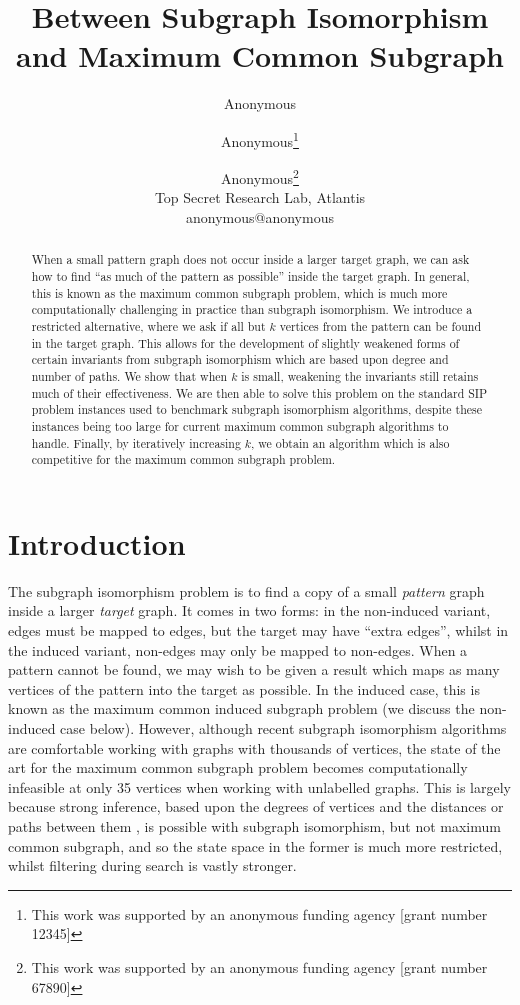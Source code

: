 \documentclass[letterpaper]{article}
\title{Between Subgraph Isomorphism and Maximum Common Subgraph}
\author{Anonymous \and Anonymous\thanks{This work was supported by an anonymous funding agency [grant number 12345]} \and Anonymous\thanks{This work was supported by an anonymous funding agency [grant number 67890]} \\
Top Secret Research Lab, Atlantis \\
anonymous@anonymous}
\newcommand{\citep}[1]{\cite{#1}}
\theoremstyle{definition}
\begin{document}
\maketitle

\begin{abstract}
    When a small pattern graph does not occur inside a larger target graph, we can ask how to find
    ``as much of the pattern as possible'' inside the target graph. In general, this is known as the maximum
    common subgraph problem, which is much more computationally challenging in practice than
    subgraph isomorphism. We introduce a restricted alternative, where we ask if all but $k$
    vertices from the pattern can be found in the target graph. This allows for the development of
    slightly weakened forms of certain invariants from subgraph isomorphism which are based upon degree and
    number of paths.  We show that when $k$ is small, weakening the invariants still retains much of
    their effectiveness. We are then able to solve this problem on the standard SIP problem
    instances used to benchmark subgraph isomorphism algorithms, despite these instances being
    too large for current maximum common subgraph algorithms to handle. Finally, by iteratively
    increasing $k$, we obtain an algorithm which is also competitive for the maximum common subgraph
    problem.
\end{abstract}

\section{Introduction}

The subgraph isomorphism problem is to find a copy of a small \emph{pattern} graph inside a larger
\emph{target} graph. It comes in two forms: in the non-induced variant, edges must be mapped to
edges, but the target may have ``extra edges'', whilst in the induced variant, non-edges may only be
mapped to non-edges. When a pattern cannot be found, we may wish to be given a result which maps as
many vertices of the pattern into the target as possible. In the induced case, this is known as the
maximum common induced subgraph problem (we discuss the non-induced case below). However, although
recent subgraph isomorphism algorithms are comfortable working with graphs with thousands of
vertices, the state of the art for the maximum common subgraph problem
\citep{DBLP:conf/cp/McCreeshNPS16} becomes computationally infeasible at only 35 vertices when
working with unlabelled graphs. This is largely because strong inference, based upon the degrees of
vertices \citep{DBLP:journals/ai/Solnon10} and the distances or paths between them
\citep{DBLP:conf/cp/AudemardLMGP14,DBLP:conf/cp/McCreeshP15}, is possible with subgraph isomorphism,
but not maximum common subgraph, and so the state space in the former is much more restricted,
whilst filtering during search is vastly stronger.
\end{document}
